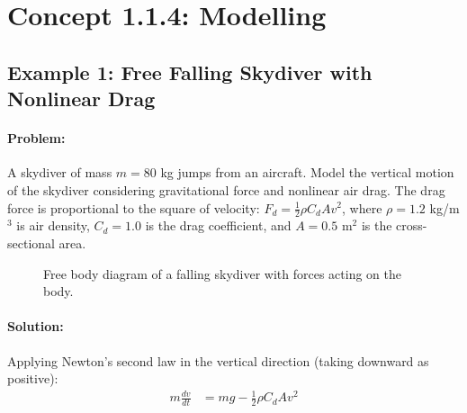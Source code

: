 \documentclass[11pt,a4paper]{article}
\begin{document}
\section{Concept 1.1.4: Modelling}

\subsection{Example 1: Free Falling Skydiver with Nonlinear Drag}

\paragraph{Problem:} A skydiver of mass $m = 80$ kg jumps from an aircraft. Model the vertical motion of the skydiver considering gravitational force and nonlinear air drag. The drag force is proportional to the square of velocity: $F_d = \frac{1}{2}\rho C_d A v^2$, where $\rho = 1.2$ kg/m$^3$ is air density, $C_d = 1.0$ is the drag coefficient, and $A = 0.5$ m$^2$ is the cross-sectional area.

\begin{figure}[h]
\centering
{}
\caption{Free body diagram of a falling skydiver with forces acting on the body.}
\end{figure}

\paragraph{Solution:} 

Applying Newton's second law in the vertical direction (taking downward as positive):
\begin{align}
m\frac{dv}{dt} &= mg - \frac{1}{2}\rho C_d A v^2
\end{align}
\end{document}
